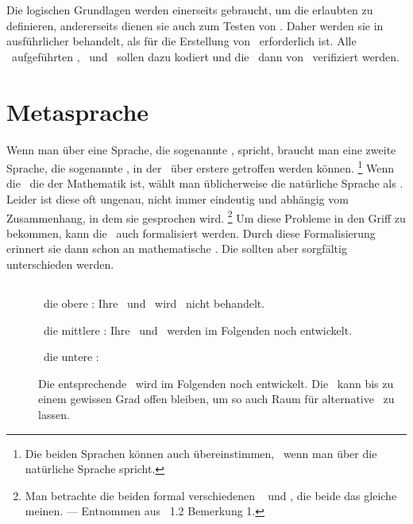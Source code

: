 \footnoteForNotDefinedItem

Die logischen Grundlagen werden einerseits gebraucht, um die erlaubten \Beweisschritte{} zu definieren, andererseits dienen sie auch zum Testen von \ASBA.
Daher werden sie in  ausführlicher behandelt, als für die Erstellung von \ASBA\ erforderlich ist.
Alle \hier\ aufgeführten \Axiome, \Saetze\ und \Beweise\ sollen dazu kodiert und die \Beweise\ dann von \ASBA\ verifiziert werden.

\section     {Metasprache}%
\label   {sec:Metasprache}

Wenn man über eine Sprache, die sogenannte \Objektsprache, spricht, braucht man eine zweite Sprache, die sogenannte \Metasprache, in der \Aussagen\ über erstere getroffen werden können.%
\footnote{%
	Die beiden Sprachen können auch übereinstimmen, \textzB\ wenn man über die natürliche Sprache spricht.
}
Wenn die \Objektsprache\ die der Mathematik ist, wählt man üblicherweise die natürliche Sprache als \Metasprache.
Leider ist diese oft ungenau, nicht immer eindeutig und abhängig vom Zusammenhang, in dem sie gesprochen wird.%
\footnote{%
	Man betrachte die beiden formal verschiedenen \Aussagen\  und , die beide das gleiche meinen.
	--- Entnommen aus \cite{bib:Rautenberg} \sectionname~1.2 Bemerkung 1.
}
Um diese Probleme in den Griff zu bekommen, kann die \Metasprache\ auch formalisiert werden.
Durch diese Formalisierung erinnert sie dann schon an mathematische \Formeln.
Die  sollten aber sorgfältig unterschieden werden.

\subsection[Sprachebenen]{\Sprachebenen}%
\label {sub:Sprachebenen}

\begin{description}
	\item[] \Hier\ die obere \Sprachebene:
	Ihre \Syntax\ und \Semantik\ wird \hier\ nicht behandelt.

	\item[] \Hier\ die mittlere \Sprachebene:
	Ihre \Syntax\ und \Semantik\ werden im Folgenden noch entwickelt.

	\item[] \Hier\ die untere \Sprachebene:

	Die entsprechende \Syntax\ wird im Folgenden noch entwickelt.
	Die \Semantik\ kann bis zu einem gewissen Grad offen bleiben, um so auch Raum für alternative \Logiken\ zu lassen.
\end{description}

